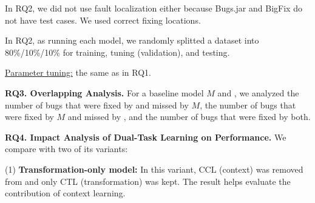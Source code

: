 



In RQ2, we did not use fault localization either because Bugs.jar and
BigFix do not have test cases. We used correct fixing locations.

In RQ2, as running each model, we randomly splitted a dataset
into 80\%/10\%/10\% for training, tuning (validation), and testing.




\underline{Parameter tuning:} the same as in RQ1.



{\bf RQ3. Overlapping Analysis.} For a baseline model $M$ and {\tool},
we analyzed the number of bugs that were fixed by {\tool}
and missed by $M$, the number of bugs that were fixed by $M$ and
missed by {\tool}, and the number of bugs that were fixed by
both.


{\bf RQ4. Impact Analysis of Dual-Task Learning on Performance.}
We compare {\tool} with two of its variants:

(1) \textbf{Transformation-only model:} In this variant, CCL (context)
was removed from {\tool} and only CTL (transformation) was kept. The
result helps evaluate the contribution of context learning.

